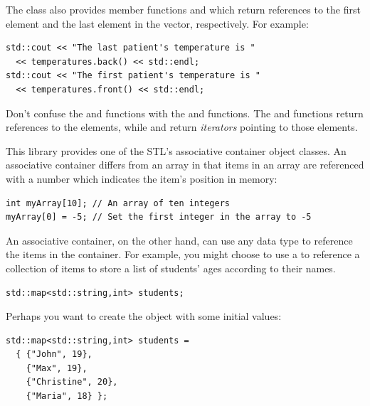 The  class also provides member functions  and  which return references to the first element and the last element in the vector, respectively.
For example:

\noindent\begin{minipage}{\linewidth}\begin{lstlisting}
std::cout << "The last patient's temperature is " 
  << temperatures.back() << std::endl;
std::cout << "The first patient's temperature is " 
  << temperatures.front() << std::endl;
\end{lstlisting}\end{minipage}

Don't confuse the  and  functions with the  and  functions. 
The  and  functions return references to the elements, while  and  return \emph{iterators} pointing to those elements.


This library provides one of the STL's associative container object classes. 
An associative container differs from an array in that items in an array are referenced with a number which indicates the item's position in memory:

\noindent\begin{minipage}{\linewidth}\begin{lstlisting}
int myArray[10]; // An array of ten integers
myArray[0] = -5; // Set the first integer in the array to -5
\end{lstlisting}\end{minipage}

An associative container, on the other hand, can use any data type to reference the items in the container. 
For example, you might choose to use a  to reference a collection of  items to store a list of students' ages according to their names.

\noindent\begin{minipage}{\linewidth}\begin{lstlisting}
std::map<std::string,int> students;
\end{lstlisting}\end{minipage}

Perhaps you want to create the object with some initial values:

\noindent\begin{minipage}{\linewidth}\begin{lstlisting}
std::map<std::string,int> students = 
  { {"John", 19}, 
    {"Max", 19}, 
    {"Christine", 20}, 
    {"Maria", 18} };
\end{lstlisting}\end{minipage}

